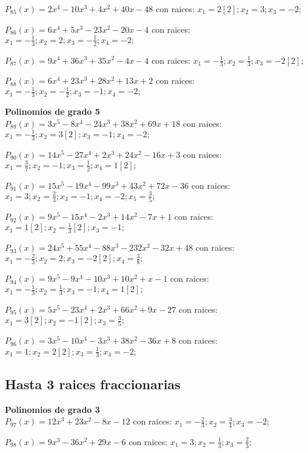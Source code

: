 \subitem $P_{85}(x) = 2x^4 - 10x^3 + 4x^2 + 40x - 48$ con raices: $x_1 = 2[2] ; x_2 = 3 ; x_3 = -2 ;  $

\subitem $P_{86}(x) = 6x^4 + 5x^3 - 23x^2 - 20x - 4$ con raices: $x_1 = -\frac{1}{3} ; x_2 = 2 ; x_3 = -\frac{1}{2} ; x_4 = -2 ;  $

\subitem $P_{87}(x) = 9x^4 + 36x^3 + 35x^2 - 4x - 4$ con raices: $x_1 = -\frac{1}{3} ; x_2 = \frac{1}{3} ; x_3 = -2[2] ;  $

\subitem $P_{88}(x) = 6x^4 + 23x^3 + 28x^2 + 13x + 2$ con raices: $x_1 = -\frac{1}{3} ; x_2 = -\frac{1}{2} ; x_3 = -1 ; x_4 = -2 ;  $

\textbf{Polinomios de grado 5\\} 
\subitem $P_{89}(x) = 3x^5 - 8x^4 - 24x^3 + 38x^2 + 69x + 18$ con raices: $x_1 = -\frac{1}{3} ; x_2 = 3[2] ; x_3 = -1 ; x_4 = -2 ;  $

\subitem $P_{90}(x) = 14x^5 - 27x^4 + 2x^3 + 24x^2 - 16x + 3$ con raices: $x_1 = \frac{3}{7} ; x_2 = -1 ; x_3 = \frac{1}{2} ; x_4 = 1[2] ;  $

\subitem $P_{91}(x) = 15x^5 - 19x^4 - 99x^3 + 43x^2 + 72x - 36$ con raices: $x_1 = 3 ; x_2 = \frac{2}{3} ; x_3 = -1 ; x_4 = -2 ; x_5 = \frac{3}{5} ;  $

\subitem $P_{92}(x) = 9x^5 - 15x^4 - 2x^3 + 14x^2 - 7x + 1$ con raices: $x_1 = 1[2] ; x_2 = \frac{1}{3}[2] ; x_3 = -1 ;  $

\subitem $P_{93}(x) = 24x^5 + 55x^4 - 88x^3 - 232x^2 - 32x + 48$ con raices: $x_1 = -\frac{2}{3} ; x_2 = 2 ; x_3 = -2[2] ; x_4 = \frac{3}{8} ;  $

\subitem $P_{94}(x) = 9x^5 - 9x^4 - 10x^3 + 10x^2 + x - 1$ con raices: $x_1 = -\frac{1}{3} ; x_2 = \frac{1}{3} ; x_3 = -1 ; x_4 = 1[2] ;  $

\subitem $P_{95}(x) = 5x^5 - 23x^4 + 2x^3 + 66x^2 + 9x - 27$ con raices: $x_1 = 3[2] ; x_2 = -1[2] ; x_3 = \frac{3}{5} ;  $

\subitem $P_{96}(x) = 3x^5 - 10x^4 - 3x^3 + 38x^2 - 36x + 8$ con raices: $x_1 = 1 ; x_2 = 2[2] ; x_3 = \frac{1}{3} ; x_4 = -2 ;  $

\subsection{Hasta 3 raices fraccionarias}
\textbf{Polinomios de grado 3\\} 
\subitem $P_{97}(x) = 12x^3 + 23x^2 - 8x - 12$ con raices: $x_1 = -\frac{2}{3} ; x_2 = \frac{3}{4} ; x_3 = -2 ;  $

\subitem $P_{98}(x) = 9x^3 - 36x^2 + 29x - 6$ con raices: $x_1 = 3 ; x_2 = \frac{1}{3} ; x_3 = \frac{2}{3} ;  $

